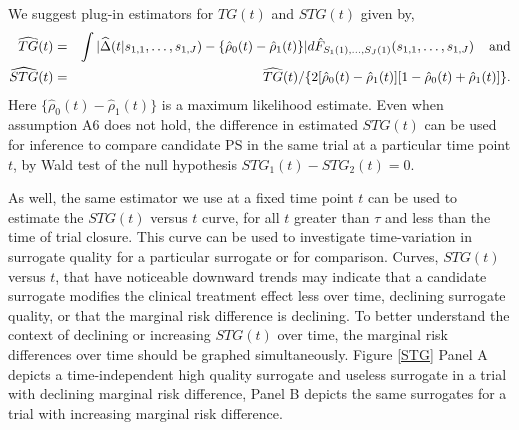 \documentclass[times, doublespace]{simauth}
\begin{document}
We suggest plug-in estimators for $TG(t)$ and $STG(t)$ given by, 
\begin{eqnarray}
\widehat{TG}(t)&=&\int{|\widehat{\Delta}(t|s_{1,1}, \dots, s_{1,J}) -\{\hat{\rho}_0(t) -\hat{\rho}_1(t)\}|d\hat{F}_{S_1(1), \ldots, S_J(1)}(s_{1,1}, \dots, s_{1,J})} \hspace{4mm} \mbox{and} \label{TG} \\
\widehat{STG}(t)&=&\widehat{TG}(t)/\{2[\hat{\rho}_0(t) - \hat{\rho}_1(t)][1-\hat{\rho}_0(t) + \hat{\rho}_1(t)]\}.
\end{eqnarray}
Here $\{\hat{\rho}_0(t) -\hat{\rho}_1(t)\}$ is a maximum likelihood estimate. Even when assumption A6 does not hold, the difference in estimated $STG(t)$ can be used for inference to compare candidate PS in the same trial at a particular time point $t$, by Wald test of the null hypothesis $STG_1(t)-STG_2(t)=0$. 

As well, the same estimator we use at a fixed time point $t$ can be used to estimate the $STG(t)$ versus $t$ curve, for all $t$ greater than $\tau$ and less than the time of trial closure. This curve can be used to investigate time-variation in surrogate quality for a particular surrogate or for comparison. Curves, $STG(t)$ versus $t$, that have noticeable downward trends may indicate that a candidate surrogate modifies the clinical treatment effect less over time, declining surrogate quality, or that the marginal risk difference is declining. To better understand the context of declining or increasing $STG(t)$ over time, the marginal risk differences over time should be graphed simultaneously. Figure \ref{STG} Panel A depicts a time-independent high quality surrogate and useless surrogate in a trial with declining marginal risk difference, Panel B depicts the same surrogates for a trial with increasing marginal risk difference. 
\end{document}
